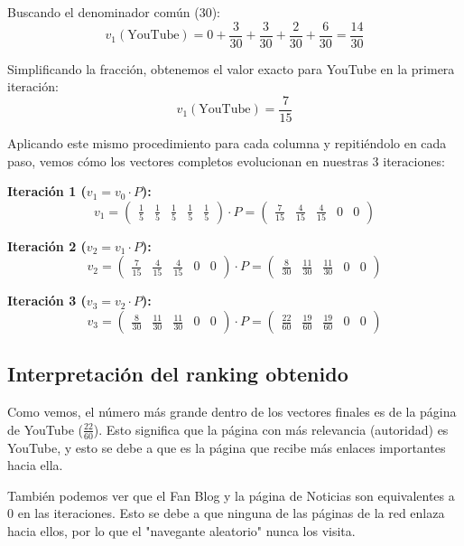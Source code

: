 \documentclass[12pt,letterpaper]{article}
\begin{document}
Buscando el denominador común (30):
\begin{equation}
    v_1(\text{YouTube}) = 0 + \frac{3}{30} + \frac{3}{30} + \frac{2}{30} + \frac{6}{30} = \frac{14}{30}
\end{equation}

Simplificando la fracción, obtenemos el valor exacto para YouTube en la primera iteración:
\begin{equation}
    v_1(\text{YouTube}) = \frac{7}{15}
\end{equation}

Aplicando este mismo procedimiento para cada columna y repitiéndolo en cada paso, vemos cómo los vectores completos evolucionan en nuestras 3 iteraciones:

\textbf{Iteración 1 ($v_1 = v_0 \cdot P$):}
\begin{equation*}
    v_1 = \begin{pmatrix} \frac{1}{5} & \frac{1}{5} & \frac{1}{5} & \frac{1}{5} & \frac{1}{5} \end{pmatrix} \cdot P = \begin{pmatrix} \frac{7}{15} & \frac{4}{15} & \frac{4}{15} & 0 & 0 \end{pmatrix}
\end{equation*}

\textbf{Iteración 2 ($v_2 = v_1 \cdot P$):}
\begin{equation*}
    v_2 = \begin{pmatrix} \frac{7}{15} & \frac{4}{15} & \frac{4}{15} & 0 & 0 \end{pmatrix} \cdot P = \begin{pmatrix} \frac{8}{30} & \frac{11}{30} & \frac{11}{30} & 0 & 0 \end{pmatrix}
\end{equation*}

\textbf{Iteración 3 ($v_3 = v_2 \cdot P$):}
\begin{equation*}
    v_3 = \begin{pmatrix} \frac{8}{30} & \frac{11}{30} & \frac{11}{30} & 0 & 0 \end{pmatrix} \cdot P = \begin{pmatrix} \frac{22}{60} & \frac{19}{60} & \frac{19}{60} & 0 & 0 \end{pmatrix}
\end{equation*}

\subsection{Interpretación del ranking obtenido}
Como vemos, el número más grande dentro de los vectores finales es de la página de YouTube ($\frac{22}{60}$). Esto significa que la página con más relevancia (autoridad) es YouTube, y esto se debe a que es la página que recibe más enlaces importantes hacia ella.

También podemos ver que el Fan Blog y la página de Noticias son equivalentes a 0 en las iteraciones. Esto se debe a que ninguna de las páginas de la red enlaza hacia ellos, por lo que el "navegante aleatorio" nunca los visita.
\end{document}
